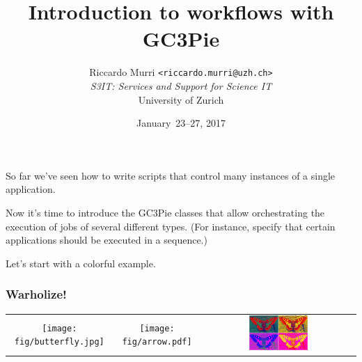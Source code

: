 \documentclass[english,serif,mathserif,xcolor=pdftex,dvipsnames,table]{beamer}
\title[Workflows]{%
  Introduction to workflows with GC3Pie
}
\author[R. Murri, S3IT UZH]{%
  Riccardo Murri \texttt{<riccardo.murri@uzh.ch>}
  \\[1ex]
  \emph{S3IT: Services and Support for Science IT}
  \\[1ex]
  University of Zurich
}
\date{January~23--27, 2017}
\begin{document}
\maketitle









\begin{frame}

  So far we've seen how to write scripts that control many instances of
  a single application.

  \+
  Now it's time to introduce the GC3Pie classes that allow
  orchestrating the execution of jobs of several different types. (For
  instance, specify that certain applications should be executed in a
  sequence.)

  \+
  Let's start with a colorful example.
\end{frame}


\begin{frame}
  \frametitle{Warholize!}

  \begin{tabular}[c]{ccc}
    \texttt{[image: fig/butterfly.jpg]}
    &
    {\texttt{[image: fig/arrow.pdf]}}
    &
    \includegraphics[width=0.4\textwidth]{fig/warholized-butterfly.jpg}
  \end{tabular}
\end{frame}
\end{document}
